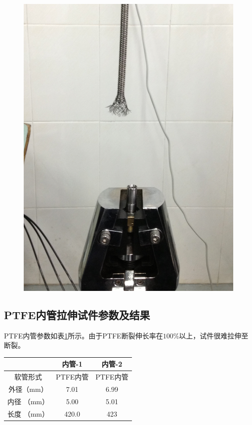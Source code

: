 \begin{figure}[!htp]
{\includegraphics[height=0.21\textheight]{figure/experiment/E2/fail-2}
\label{fig:fail-2}
}
\label{fig:failure-experiment-ii}
\end{figure}


\subsection{PTFE内管拉伸试件参数及结果}

PTFE内管参数如表\ref{tab:hose-specimen-II-22}所示。由于PTFE断裂伸长率在$ 100\% $以上\cite{zhuyouliang2006}，试件很难拉伸至断裂。
\begin{table}[!htb]
	\centering
	\label{tab:hose-specimen-II-22}
	\begin{tabular*}{0.8\textwidth}{@{\extracolsep{\fill}}>{\hspace{0.5cm}}ccc}
		\toprule
		&      内管-1     &     内管-2     \\ \midrule
		软管形式& PTFE内管&PTFE内管\\
		外径（mm）            &     7.01      &     6.99      \\
		内径 （mm）           &     5.00      &     5.01      \\
		长度 （mm）           &     420.0     &     423     \\ \bottomrule
	\end{tabular*} 
\end{table}


